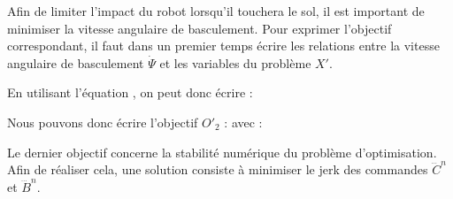 				
					Afin de limiter l'impact du robot lorsqu'il touchera le sol, il est important de minimiser la vitesse angulaire de basculement.
					Pour exprimer l'objectif correspondant, il faut dans un premier temps écrire les relations entre la vitesse angulaire de basculement $\dot{\Psi}$ et les variables du problème $X'$.
					
					En utilisant l'équation , on peut donc écrire :

					Nous pouvons donc écrire l'objectif $O'_2$ : 
					avec :
				
				
					Le dernier objectif concerne la stabilité numérique du problème d'optimisation.
					Afin de réaliser cela, une solution consiste à minimiser le jerk des commandes $\dddot{C}^{n}$ et $\dddot{B}^{n}$.
					
